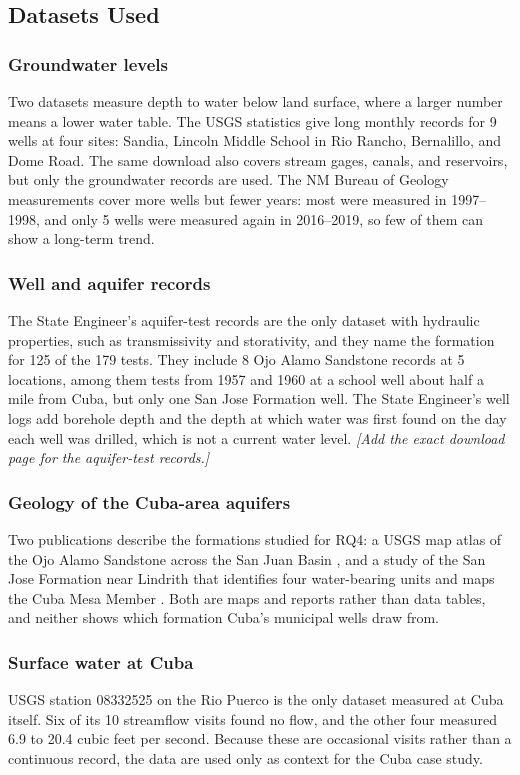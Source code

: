 \documentclass[10pt,twocolumn,letterpaper]{article}
\newif\ifdraftnotes \draftnotestrue   %
\newcommand{\draftnote}[1]{\ifdraftnotes{\color{draftorange}\itshape[#1]}\fi}
\begin{document}
\subsection{Datasets Used}
\subsubsection{Groundwater levels}
Two datasets measure depth to water below land surface, where a larger number means a lower
water table. The USGS statistics \citep{usgs_stats} give long monthly records for 9 wells at four
sites: Sandia, Lincoln Middle School in Rio Rancho, Bernalillo, and Dome Road. The same download also covers stream gages, canals, and
reservoirs, but only the groundwater records are used. The NM Bureau of Geology measurements
\citep{nmwd_levels} cover more wells but fewer years: most were measured in 1997--1998, and only
5 wells were measured again in 2016--2019, so few of them can show a long-term trend.

\subsubsection{Well and aquifer records}
The State Engineer's aquifer-test records \citep{ose_aquifertests} are the only dataset with
hydraulic properties, such as transmissivity and storativity, and they name the formation for
125 of the 179 tests. They include 8 Ojo Alamo Sandstone records at 5 locations, among them tests
from 1957 and 1960 at a school well about half a mile from Cuba, but only one San Jose Formation
well. The State Engineer's well logs \citep{ose_welllogs} add borehole depth and the depth at which
water was first found on the day each well was drilled, which is not a current water level.
\draftnote{Add the exact download page for the aquifer-test records.}

\subsubsection{Geology of the Cuba-area aquifers}
Two publications describe the formations studied for RQ4: a USGS map atlas of the Ojo Alamo
Sandstone across the San Juan Basin \citep{thorn1990}, and a study of the San Jose Formation near
Lindrith that identifies four water-bearing units and maps the Cuba Mesa Member
\citep{blandford2025}. Both are maps and reports rather than data tables, and neither shows which
formation Cuba's municipal wells draw from.

\subsubsection{Surface water at Cuba}
USGS station 08332525 on the Rio Puerco \citep{usgs_riopuerco} is the only dataset measured at
Cuba itself. Six of its 10 streamflow visits found no flow, and the other four measured 6.9 to
20.4 cubic feet per second. Because these are occasional visits rather than a continuous record,
the data are used only as context for the Cuba case study.
\end{document}
